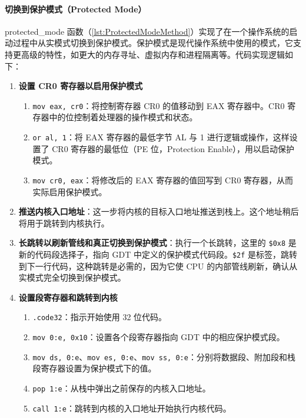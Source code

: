 \paragraph{切换到保护模式（Protected Mode）}

protected\_mode 函数（\cref{lst:ProtectedModeMethod}）实现了在一个操作系统的启动过程中从实模式切换到保护模式。保护模式是现代操作系统中使用的模式，它支持更高级的特性，如更大的内存寻址、虚拟内存和进程隔离等。代码实现逻辑如下：

\begin{enumerate}
    \item \textbf{设置 CR0 寄存器以启用保护模式}
          \begin{enumerate}
              \item \texttt{mov eax, cr0}：将控制寄存器 CR0 的值移动到 EAX 寄存器中。CR0 寄存器中的位控制着处理器的操作模式和状态。
              \item \texttt{or al, 1}：将 EAX 寄存器的最低字节 AL 与 1 进行逻辑或操作，这样设置了 CR0 寄存器的最低位（PE 位，Protection Enable），用以启动保护模式。
              \item \texttt{mov cr0, eax}：将修改后的 EAX 寄存器的值回写到 CR0 寄存器，从而实际启用保护模式。
          \end{enumerate}
    \item \textbf{推送内核入口地址}：这一步将内核的目标入口地址推送到栈上。这个地址稍后将用于跳转到内核执行。
    \item \textbf{长跳转以刷新管线和真正切换到保护模式}：执行一个长跳转，这里的 \texttt{\$0x8} 是新的代码段选择子，指向 GDT 中定义的保护模式代码段。\texttt{\$2f} 是标签，跳转到下一行代码，这种跳转是必需的，因为它使 CPU 的内部管线刷新，确认从实模式完全切换到保护模式。
    \item \textbf{设置段寄存器和跳转到内核}
          \begin{enumerate}
              \item \texttt{.code32}：指示开始使用 32 位代码。
              \item \texttt{mov {0:e}, 0x10}：设置各个段寄存器指向 GDT 中的相应保护模式段。
              \item \texttt{mov ds, {0:e}}、\texttt{mov es, {0:e}}、\texttt{mov ss, {0:e}}：分别将数据段、附加段和栈段寄存器设置为保护模式下的值。
              \item \texttt{pop {1:e}}：从栈中弹出之前保存的内核入口地址。
              \item \texttt{call {1:e}}：跳转到内核的入口地址开始执行内核代码。
          \end{enumerate}
\end{enumerate}

